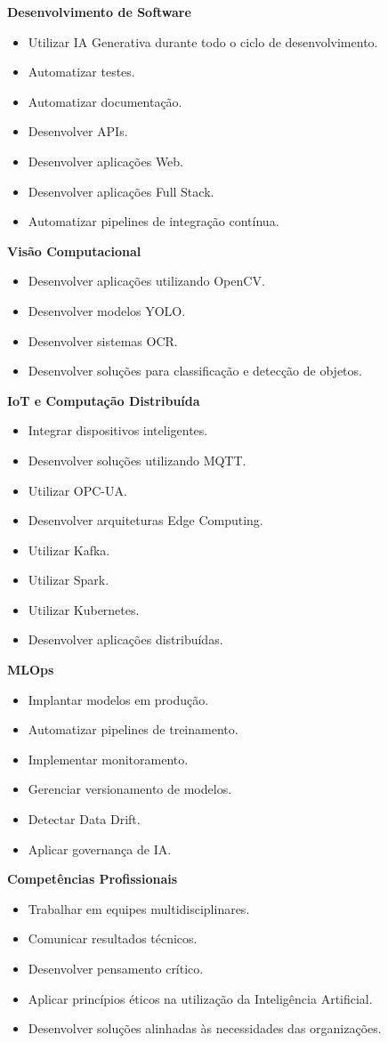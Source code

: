 \textbf{Desenvolvimento de Software}
\begin{itemize}
    \item Utilizar IA Generativa durante todo o ciclo de desenvolvimento.
    \item Automatizar testes.
    \item Automatizar documentação.
    \item Desenvolver APIs.
    \item Desenvolver aplicações Web.
    \item Desenvolver aplicações Full Stack.
    \item Automatizar pipelines de integração contínua.
\end{itemize}

\textbf{Visão Computacional}
\begin{itemize}
    \item Desenvolver aplicações utilizando OpenCV.
    \item Desenvolver modelos YOLO.
    \item Desenvolver sistemas OCR.
    \item Desenvolver soluções para classificação e detecção de objetos.
\end{itemize}

\textbf{IoT e Computação Distribuída}
\begin{itemize}
    \item Integrar dispositivos inteligentes.
    \item Desenvolver soluções utilizando MQTT.
    \item Utilizar OPC-UA.
    \item Desenvolver arquiteturas Edge Computing.
    \item Utilizar Kafka.
    \item Utilizar Spark.
    \item Utilizar Kubernetes.
    \item Desenvolver aplicações distribuídas.
\end{itemize}

\textbf{MLOps}
\begin{itemize}
    \item Implantar modelos em produção.
    \item Automatizar pipelines de treinamento.
    \item Implementar monitoramento.
    \item Gerenciar versionamento de modelos.
    \item Detectar Data Drift.
    \item Aplicar governança de IA.
\end{itemize}

\textbf{Competências Profissionais}
\begin{itemize}
    \item Trabalhar em equipes multidisciplinares.
    \item Comunicar resultados técnicos.
    \item Desenvolver pensamento crítico.
    \item Aplicar princípios éticos na utilização da Inteligência Artificial.
    \item Desenvolver soluções alinhadas às necessidades das organizações.
\end{itemize}